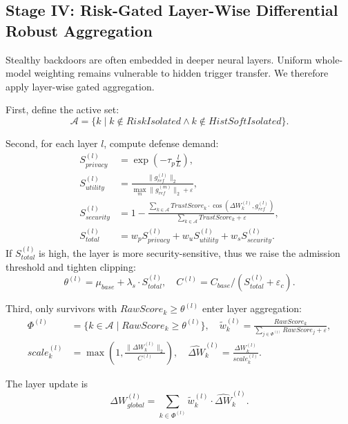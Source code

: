 \documentclass[runningheads]{llncs}
\begin{document}
\subsection{Stage IV: Risk-Gated Layer-Wise Differential Robust Aggregation}
Stealthy backdoors are often embedded in deeper neural layers. Uniform whole-model weighting remains vulnerable to hidden trigger transfer. We therefore apply layer-wise gated aggregation.

First, define the active set:
\begin{equation} \label{eq:active_clients}
    \mathcal{A} = \{k \mid k \notin RiskIsolated \land k \notin HistSoftIsolated\}.
\end{equation}

Second, for each layer $l$, compute defense demand:
\begin{align}
    S_{privacy}^{(l)} &= \exp\left(-\tau_{p} \frac{l}{L}\right), \\
    S_{utility}^{(l)} &= \frac{\|g_{ref}^{(l)}\|_{2}}{\max_{m}\|g_{ref}^{(m)}\|_{2} + \varepsilon}, \\
    S_{security}^{(l)} &= 1 - \frac{\sum_{k\in\mathcal{A}}TrustScore_{k}\cdot\cos(\Delta W_{k}^{(l)}, g_{ref}^{(l)})}{\sum_{k\in\mathcal{A}}TrustScore_{k} + \varepsilon}, \\
    S_{total}^{(l)} &= w_p S_{privacy}^{(l)} + w_u S_{utility}^{(l)} + w_s S_{security}^{(l)}.
\end{align}
If $S_{total}^{(l)}$ is high, the layer is more security-sensitive, thus we raise the admission threshold and tighten clipping:
\begin{equation}
\theta^{(l)} = \mu_{base} + \lambda_{s} \cdot S_{total}^{(l)}, \quad C^{(l)} = C_{base} / (S_{total}^{(l)} + \varepsilon_{c}).
\end{equation}

Third, only survivors with $RawScore_k \ge \theta^{(l)}$ enter layer aggregation:
\begin{align}
    \Phi^{(l)} &= \{k \in \mathcal{A} \mid RawScore_{k} \ge \theta^{(l)} \}, \quad \tilde{w}_{k}^{(l)} = \frac{RawScore_{k}}{\sum_{j\in\Phi^{(l)}}RawScore_{j} + \varepsilon}, \\
    scale_{k}^{(l)} &= \max\left(1, \frac{\|\Delta W_{k}^{(l)}\|_{2}}{C^{(l)}}\right), \quad
    \widehat{\Delta W}_{k}^{(l)} = \frac{\Delta W_{k}^{(l)}}{scale_{k}^{(l)}}.
\end{align}

The layer update is
\begin{equation}
    \Delta W_{global}^{(l)} = \sum_{k\in\Phi^{(l)}}\tilde{w}_{k}^{(l)} \cdot \widehat{\Delta W}_{k}^{(l)}.
\end{equation}
\end{document}
